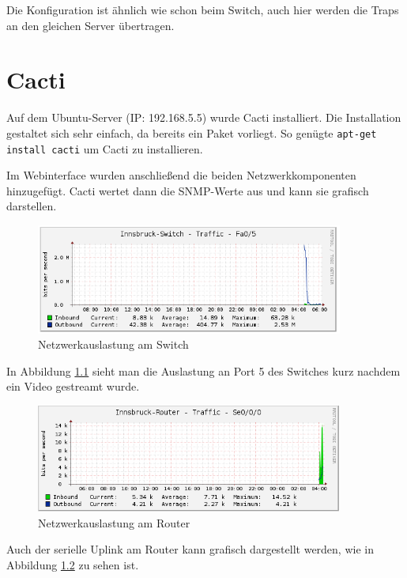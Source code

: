 Die Konfiguration ist ähnlich wie schon beim Switch, auch hier werden die Traps an den gleichen Server übertragen.



\chapter{Cacti}
\label{cacti}

Auf dem Ubuntu-Server (IP: 192.168.5.5) wurde Cacti installiert. Die Installation gestaltet sich sehr einfach, da bereits ein Paket vorliegt. 
So genügte \texttt{apt-get install cacti} um Cacti zu installieren.

Im Webinterface wurden anschließend die beiden Netzwerkkomponenten hinzugefügt. Cacti wertet dann die \ac{SNMP}-Werte aus und kann sie grafisch darstellen.

\begin{figure}[H]
	\centering
	\includegraphics[width=0.9\textwidth]{img/andi_youtube.PNG}
	\caption{Netzwerkauslastung am Switch}
	\label{img:yt}
\end{figure}

In Abbildung \ref{img:yt} sieht man die Auslastung an Port 5 des Switches kurz nachdem ein Video gestreamt wurde. 

\begin{figure}[H]
	\centering
	\includegraphics[width=0.9\textwidth]{img/cacti_graph_s00.PNG}
	\caption{Netzwerkauslastung am Router}
	\label{img:uplink}
\end{figure}

Auch der serielle Uplink am Router kann grafisch dargestellt werden, wie in Abbildung \ref{img:uplink} zu sehen ist.

